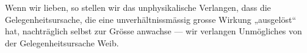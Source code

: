 Wenn wir lieben, so stellen wir das unphysikalische Verlangen, dass die Gelegenheitsursache, die eine unverhältnissmässig grosse Wirkung „ausgelöst“ hat, nachträglich selbst zur Grösse anwachse — wir verlangen Unmögliches von der Gelegenheitsursache Weib.
\par

